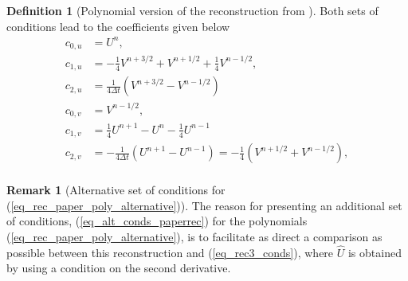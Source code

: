 \documentclass[12pt,a4paper]{article}
\numberwithin{equation}{section}
\theoremstyle{definition}
\newcommand{\qp}[1]{\left(#1\right)}
\newcommand{\rec}[1]{\widehat{{#1}}}
\newtheorem{Defn}[subsection]{Definition}
\newtheorem{Rem}[subsection]{Remark}
\begin{document}
\begin{Defn}[Polynomial version of the reconstruction from \cite{georgoulis2016posteriori}]
	Both sets of conditions lead to the coefficients given below
	\begin{equation}\label{eq_coeffs_paperrec}
	\begin{aligned}
	c_{0,u} &= U^{n},\\
	c_{1,u}&=-\frac{1}{4}V^{n+3/2}+V^{n+1/2}+\frac{1}{4}V^{n-1/2},\\
	c_{2,u}&=\frac{1}{4\Delta t}\qp{V^{n+3/2}-V^{n-1/2}}\\%
	c_{0,v} &= V^{n-1/2},\\
	c_{1,v}&= \frac{1}{4}U^{n+1}-U^n-\frac{1}{4}U^{n-1}\\
	c_{2,v}&=-\frac{1}{4\Delta t}\qp{U^{n+1}-U^{n-1}}=-\frac{1}{4}\qp{V^{n+1/2}+V^{n-1/2}},\\
	\end{aligned}
	\end{equation}
\end{Defn}
\begin{Rem}[Alternative set of conditions for (\ref{eq_rec_paper_poly_alternative})]
The reason for presenting an additional set of conditions, (\ref{eq_alt_conds_paperrec}) for the polynomials (\ref{eq_rec_paper_poly_alternative}), is to facilitate as direct a comparison as possible between this reconstruction and (\ref{eq_rec3_conds}), where $\rec{U}$ is obtained by using a condition on the second derivative.
\end{Rem}
\end{document}
